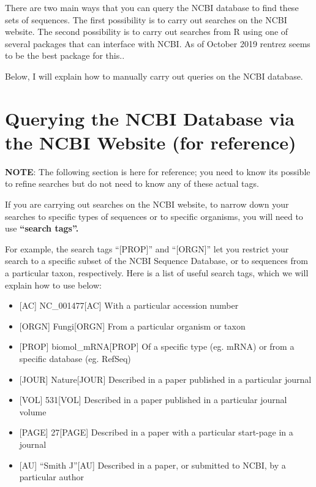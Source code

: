 \documentclass[
]{book}
\providecommand{\tightlist}{%
  \setlength{\itemsep}{0pt}\setlength{\parskip}{0pt}}
\begin{document}
There are two main ways that you can query the NCBI database to find these sets of sequences. The first possibility is to carry out searches on the NCBI website. The second possibility is to carry out searches from R using one of several packages that can interface with NCBI. As of October 2019 rentrez seems to be the best package for this..

Below, I will explain how to manually carry out queries on the NCBI database.

\hypertarget{querying-the-ncbi-database-via-the-ncbi-website-for-reference}{%
\section{Querying the NCBI Database via the NCBI Website (for reference)}\label{querying-the-ncbi-database-via-the-ncbi-website-for-reference}}

\textbf{NOTE}: The following section is here for reference; you need to know its possible to refine searches but do not need to know any of these actual tags.

If you are carrying out searches on the NCBI website, to narrow down your searches to specific types of sequences or to specific organisms, you will need to use \textbf{``search tags''.}

For example, the search tags ``{[}PROP{]}'' and ``{[}ORGN{]}'' let you restrict your search to a specific subset of the NCBI Sequence Database, or to sequences from a particular taxon, respectively. Here is a list of useful search tags, which we will explain how to use below:

\begin{itemize}
\tightlist
\item
  {[}AC{]} NC\_001477{[}AC{]} With a particular accession number
\item
  {[}ORGN{]} Fungi{[}ORGN{]} From a particular organism or taxon
\item
  {[}PROP{]} biomol\_mRNA{[}PROP{]} Of a specific type (eg. mRNA) or from a specific database (eg. RefSeq)
\item
  {[}JOUR{]} Nature{[}JOUR{]} Described in a paper published in a particular journal
\item
  {[}VOL{]} 531{[}VOL{]} Described in a paper published in a particular journal volume
\item
  {[}PAGE{]} 27{[}PAGE{]} Described in a paper with a particular start-page in a journal
\item
  {[}AU{]} ``Smith J''{[}AU{]} Described in a paper, or submitted to NCBI, by a particular author
\end{itemize}
\end{document}
